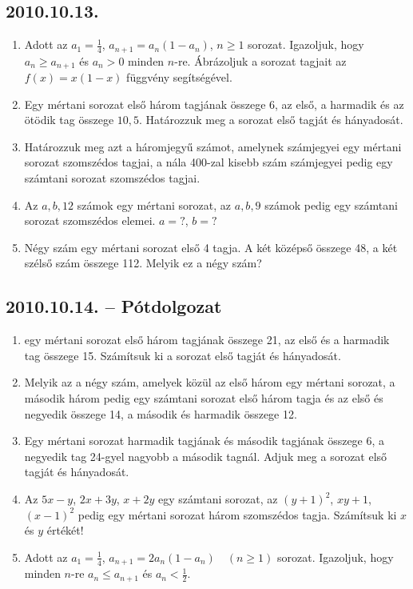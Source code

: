 \documentclass{article}
\begin{document}
\subsection*{2010.10.13.}
\begin{enumerate}
\item Adott az $a_1=\frac{1}{4}$, $a_{n+1}=a_n(1-a_n)$, $n\ge 1$ sorozat. Igazoljuk, hogy $a_n\ge a_{n+1}$ és $a_n>0$ minden $n$-re. Ábrázoljuk a sorozat tagjait az $f(x)=x(1-x)$ függvény segítségével.
\item Egy mértani sorozat első három tagjának összege 6, az első, a harmadik és az ötödik tag összege $10{,}5$. Határozzuk meg a sorozat első tagját és hányadosát.
\item Határozzuk meg azt a háromjegyű számot, amelynek számjegyei egy mértani sorozat szomszédos tagjai, a nála 400-zal kisebb szám számjegyei pedig egy számtani sorozat szomszédos tagjai.
\item Az $a,b,12$ számok egy mértani sorozat, az $a,b,9$ számok pedig egy számtani sorozat szomszédos elemei. $a=?$, $b=?$
\item Négy szám egy mértani sorozat első 4 tagja.
A két középső összege 48, a két szélső szám összege 112. Melyik ez a négy szám?
\end{enumerate}


\subsection*{2010.10.14. -- Pótdolgozat}
\begin{enumerate}
\item egy mértani sorozat első három tagjának összege 21, az első és a harmadik tag összege 15. Számítsuk ki a sorozat első tagját és hányadosát.
\item Melyik az a négy szám, amelyek közül az első három egy mértani sorozat, a második három pedig egy számtani sorozat első három tagja és az első és negyedik összege 14, a második és harmadik összege 12.
\item Egy mértani sorozat harmadik tagjának és második tagjának összege 6, a negyedik tag 24-gyel nagyobb a második tagnál. Adjuk meg a sorozat első tagját és hányadosát.
\item Az $5x-y$, $2x+3y$, $x+2y$ egy számtani sorozat, az $(y+1)^2$, $xy+1$, $(x-1)^2$ pedig egy mértani sorozat három szomszédos tagja. Számítsuk ki $x$ és $y$ értékét!
\item Adott az $a_1=\frac{1}{4}$, $a_{n+1}=2a_n(1-a_n)\quad (n\ge 1)$ sorozat. Igazoljuk, hogy minden $n$-re $a_n\le a_{n+1}$ és $a_n<\frac{1}{2}$.
\end{enumerate}
\end{document}
